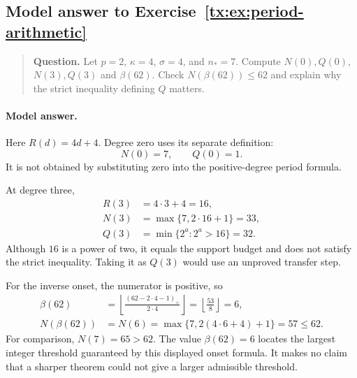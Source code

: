 \documentclass[11pt,a4paper,oneside,openany]{book}
\theoremstyle{definition}\newtheorem{definition}[theorem]{Definition}
\theoremstyle{remark}\newtheorem{remark}[theorem]{Remark}
\numberwithin{equation}{chapter}
\begin{document}
\begin{samepage}

\subsection*{Model answer to Exercise~\ref{tx:ex:period-arithmetic}}\label{tx:ans:period-arithmetic}

\begin{quote}\small\textbf{Question.} Let $p=2$, $\kappa=4$, $\sigma=4$, and $n_*=7$. Compute $N(0),Q(0)$,
$N(3),Q(3)$ and $\beta(62)$. Check $N(\beta(62))\le62$ and explain
why the strict inequality defining $Q$ matters.
\end{quote}

\paragraph{Model answer.}
Here \(R(d)=4d+4\). Degree zero uses its separate definition:
\[
                            N(0)=7,\qquad Q(0)=1.
\]
It is not obtained by substituting zero into the positive-degree
period formula.
\end{samepage}

At degree three,
\[
 \begin{aligned}
 R(3)&=4\cdot3+4=16,\\
 N(3)&=\max\{7,2\cdot16+1\}=33,\\
 Q(3)&=\min\{2^a:2^a>16\}=32.
 \end{aligned}
\]
Although \(16\) is a power of two, it equals the support budget and
does not satisfy the strict inequality. Taking it as \(Q(3)\)
would use an unproved transfer step.

For the inverse onset, the numerator is positive, so
\[
 \begin{aligned}
 \beta(62)
   &=\left\lfloor\frac{(62-2\cdot4-1)_+}{2\cdot4}\right\rfloor
     =\left\lfloor\frac{53}{8}\right\rfloor=6,\\
 N(\beta(62))
   &=N(6)=\max\{7,2(4\cdot6+4)+1\}=57\le62.
 \end{aligned}
\]
For comparison, \(N(7)=65>62\). The value \(\beta(62)=6\)
locates the largest integer threshold guaranteed by this displayed
onset formula. It makes no claim that a sharper theorem could not
give a larger admissible threshold.


\par
\end{document}

